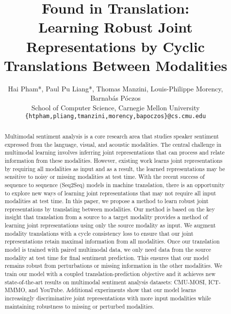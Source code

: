 \documentclass[letterpaper]{article} %
\begin{document}
%
\title{Found in Translation: \\ Learning Robust Joint Representations by Cyclic Translations Between Modalities}

\author{Hai Pham*, Paul Pu Liang*, Thomas Manzini, Louis-Philippe Morency, Barnab\'{a}s P\'{o}czos \\
School of Computer Science, Carnegie Mellon University \\
\texttt {\{htpham,pliang,tmanzini,morency,bapoczos\}@cs.cmu.edu}
}

\maketitle

\begin{abstract}
Multimodal sentiment analysis is a core research area that studies speaker sentiment expressed from the language, visual, and acoustic modalities. The central challenge in multimodal learning involves inferring joint representations that can process and relate information from these modalities. However, existing work learns joint representations by requiring all modalities as input and as a result, the learned representations may be sensitive to noisy or missing modalities at test time. With the recent success of sequence to sequence (Seq2Seq) models in machine translation, there is an opportunity to explore new ways of learning joint representations that may not require all input modalities at test time. In this paper, we propose a method to learn robust joint representations by translating between modalities. Our method is based on the key insight that translation from a source to a target modality provides a method of learning joint representations using only the source modality as input. We augment modality translations with a cycle consistency loss to ensure that our joint representations retain maximal information from all modalities. Once our translation model is trained with paired multimodal data, we only need data from the source modality at test time for final sentiment prediction. This ensures that our model remains robust from perturbations or missing information in the other modalities. We train our model with a coupled translation-prediction objective and it achieves new state-of-the-art results on multimodal sentiment analysis datasets: CMU-MOSI, ICT-MMMO, and YouTube. Additional experiments show that our model learns increasingly discriminative joint representations with more input modalities while maintaining robustness to missing or perturbed modalities.
\end{abstract}
\end{document}
